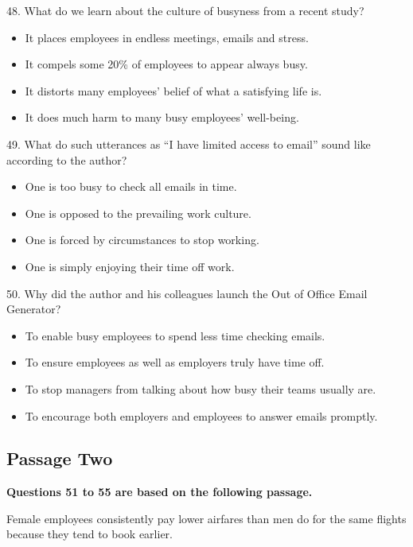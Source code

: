\documentclass[UTF8,11pt]{ctexart}
\begin{document}
48. What do we learn about the culture of busyness from a recent study?


\begin{itemize}[leftmargin=2em,itemsep=.2em,topsep=.4em]\item[A.] It places employees in endless meetings, emails and stress.
\item[B.] It compels some 20\% of employees to appear always busy.
\item[C.] It distorts many employees’ belief of what a satisfying life is.
\item[D.] It does much harm to many busy employees’ well-being.
\end{itemize}

49. What do such utterances as “I have limited access to email” sound like according to the author?


\begin{itemize}[leftmargin=2em,itemsep=.2em,topsep=.4em]\item[A.] One is too busy to check all emails in time.
\item[B.] One is opposed to the prevailing work culture.
\item[C.] One is forced by circumstances to stop working.
\item[D.] One is simply enjoying their time off work.
\end{itemize}

50. Why did the author and his colleagues launch the Out of Office Email Generator?


\begin{itemize}[leftmargin=2em,itemsep=.2em,topsep=.4em]\item[A.] To enable busy employees to spend less time checking emails.
\item[B.] To ensure employees as well as employers truly have time off.
\item[C.] To stop managers from talking about how busy their teams usually are.
\item[D.] To encourage both employers and employees to answer emails promptly.
\end{itemize}

\subsection*{\textbf{Passage Two}}


\textbf{Questions 51 to 55 are based on the following passage.}


Female employees consistently pay lower airfares than men do for the same flights because they tend to book earlier.
\end{document}
